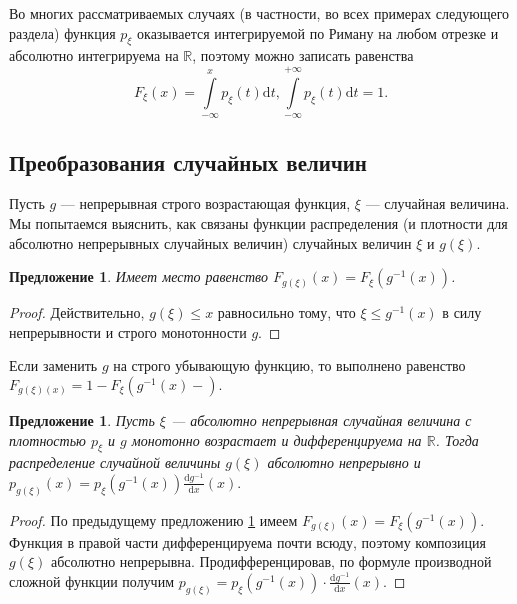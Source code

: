 \documentclass[12pt]{article}
\newtheorem{proposition}[theorem]{Предложение}
\numberwithin{theorem}{section}
\theoremstyle{definition}
\newcommand{\RR}{\mathbb{R}}
\newcommand{\diff}{\mathrm{d}}
\begin{document}
	Во многих рассматриваемых случаях (в частности, во всех примерах следующего раздела) 
	функция $ p_\xi $ оказывается интегрируемой по Риману на любом отрезке
	и абсолютно интегрируема на $ \RR $, поэтому можно записать равенства
	$$ F_\xi(x) = \int\limits_{-\infty}^{x} p_\xi(t)\diff t, \int\limits_{-\infty}^{+\infty} p_\xi(t)\diff t = 1. $$
	
	\subsection{Преобразования случайных величин}
	
	Пусть $ g $ --- непрерывная строго возрастающая функция,
	$ \xi $ --- случайная величина.
	Мы попытаемся выяснить, как связаны функции распределения (и плотности для абсолютно непрерывных случайных величин)
	случайных величин $ \xi $ и $ g(\xi) $.
	
	\begin{proposition} \label{composition distribution}
		Имеет место равенство $ F_{g(\xi)}(x) = F_{\xi}(g^{-1}(x)) $.
	\end{proposition}
	
	\begin{proof}
		Действительно, $ g(\xi) \leqslant x $ равносильно тому, что $ \xi \leqslant g^{-1}(x) $
		в силу непрерывности и строго монотонности $ g $.
	\end{proof}
	
	Если заменить $ g $ на строго убывающую функцию, то выполнено равенство
	$ F_{g(\xi)(x)} = 1 - F_{\xi}(g^{-1}(x)-). $
	
	\begin{proposition} \label{composition density}
		Пусть $ \xi $ --- абсолютно непрерывная случайная величина с плотностью $ p_\xi $
		и $ g $ монотонно возрастает и дифференцируема на $ \RR $.
		Тогда распределение случайной величины $ g(\xi) $ абсолютно непрерывно
		и $ p_{g(\xi)}(x) = p_{\xi}(g^{-1}(x))\tfrac{\diff g^{-1}}{\diff x}(x). $
	\end{proposition}
	
	\begin{proof}
		По предыдущему предложению \ref{composition distribution}
		имеем $ F_{g(\xi)}(x) = F_{\xi}(g^{-1}(x)) $.
		Функция в правой части дифференцируема почти всюду, 
		поэтому композиция $ g(\xi) $ абсолютно непрерывна.
		Продифференцировав, по формуле производной сложной функции получим
		$ p_{g(\xi)} = p_\xi(g^{-1}(x)) \cdot \tfrac{\diff g^{-1}}{\diff x}(x). $
	\end{proof}
	
\end{document}
